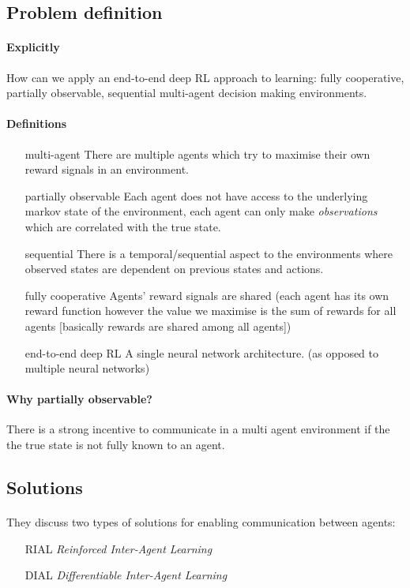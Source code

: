 \documentclass{article}
\begin{document}
    \subsection{Problem definition}

    \paragraph{Explicitly} 
    How can we apply an end-to-end deep RL approach to learning:
    fully cooperative, partially observable, sequential multi-agent decision making environments.
    \paragraph{Definitions}
    \begin{enumerate}
        \item[multi-agent] There are multiple agents which try to maximise their own reward signals in an environment.
        \item[partially observable] Each agent does not have access to the underlying markov state of the environment, each agent can only make \emph{observations} which are correlated with the true state.
        \item[sequential] There is a temporal/sequential aspect to the environments where observed states are dependent on previous states and actions.
        \item[fully cooperative] Agents' reward signals are shared (each agent has its own reward function however the value we maximise is the sum of rewards for all agents [basically rewards are shared among all agents])
        \item[end-to-end deep RL] A single neural network architecture. (as opposed to multiple neural networks)
    \end{enumerate}
        
    \paragraph{Why partially observable?} There is a strong incentive to communicate in a multi agent environment if the the true state is not fully known to an agent.

    \subsection{Solutions}

    \paragraph{} They discuss two types of solutions for enabling communication between agents:
    \begin{enumerate}
        \item[RIAL] \emph{Reinforced Inter-Agent Learning}
        \item[DIAL] \emph{Differentiable Inter-Agent Learning}
    \end{enumerate}
\end{document}
